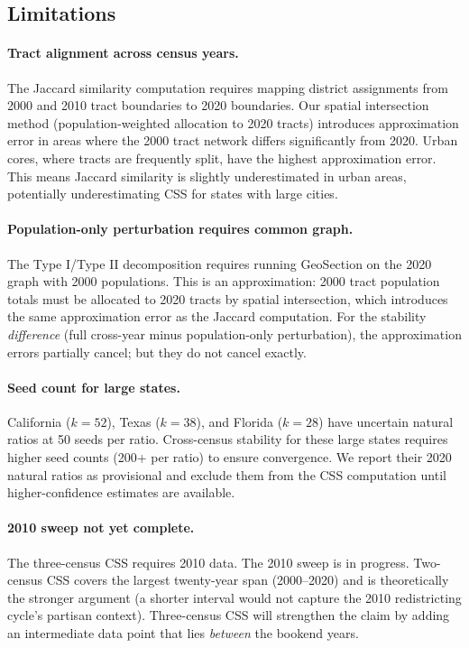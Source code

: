 \subsection{Limitations}

\paragraph{Tract alignment across census years.}
The Jaccard similarity computation requires mapping district assignments from
2000 and 2010 tract boundaries to 2020 boundaries.
Our spatial intersection method (population-weighted allocation to 2020 tracts)
introduces approximation error in areas where the 2000 tract network differs
significantly from 2020.
Urban cores, where tracts are frequently split, have the highest
approximation error.
This means Jaccard similarity is slightly underestimated in urban areas,
potentially underestimating CSS for states with large cities.

\paragraph{Population-only perturbation requires common graph.}
The Type I/Type II decomposition requires running GeoSection on the 2020
graph with 2000 populations.
This is an approximation: 2000 tract population totals must be allocated to
2020 tracts by spatial intersection, which introduces the same approximation
error as the Jaccard computation.
For the stability \emph{difference} (full cross-year minus population-only
perturbation), the approximation errors partially cancel; but they do not
cancel exactly.

\paragraph{Seed count for large states.}
California ($k=52$), Texas ($k=38$), and Florida ($k=28$) have uncertain
natural ratios at 50 seeds per ratio.
Cross-census stability for these large states requires higher seed counts
(200+ per ratio) to ensure convergence.
We report their 2020 natural ratios as provisional and exclude them from the
CSS computation until higher-confidence estimates are available.

\paragraph{2010 sweep not yet complete.}
The three-census CSS requires 2010 data.
The 2010 sweep is in progress.
Two-census CSS covers the largest twenty-year span (2000--2020) and is
theoretically the stronger argument (a shorter interval would not capture
the 2010 redistricting cycle's partisan context).
Three-census CSS will strengthen the claim by adding an intermediate
data point that lies \emph{between} the bookend years.

